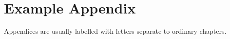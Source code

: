 \documentclass[12pt,oneside]{book}
\begin{document}
\appendix
\chapter{Example Appendix}
Appendices are usually labelled with letters separate to ordinary chapters.




%




%
%
%
%

\end{document}
